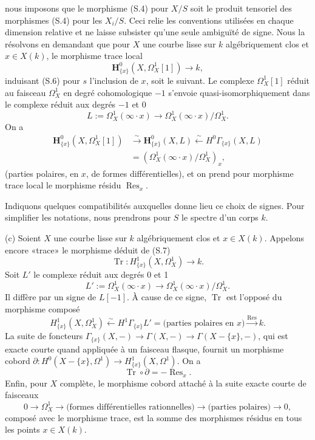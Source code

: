 \documentclass[11pt,leqno]{article}
\DeclareMathOperator{\Res}{Res}
\DeclareMathOperator{\Tr}{Tr}
\begin{document}
nous imposons que le morphisme (S.4) pour $X/S$ soit le produit tensoriel des morphismes (S.4) pour les $X_i/S$. Ceci relie les conventions utilisées en chaque dimension relative et ne laisse subsister qu'une seule ambiguïté de signe. Nous la résolvons en demandant que pour $X$ une courbe lisse sur $k$ algébriquement clos et $x\in X(k)$, le morphisme trace local
\begin{equation}
        \mathbf H^0_{\{x\}}(X,\Omega^1_X[1])\longrightarrow k, \tag{S.7}
\end{equation}
induisant (S.6) pour $s$ l'inclusion de $x$, soit le suivant. Le complexe $\Omega^1_X[1]$ réduit au faisceau $\Omega^1_X$ en degré cohomologique $-1$ s'envoie quasi-isomorphiquement dans le complexe réduit aux degrés $-1$ et 0
\[
        L:=\Omega^1_X(\infty\cdot x)\longrightarrow\Omega^1_X(\infty\cdot x)/\Omega^1_X.
\]
On a
\[
\begin{aligned}
\mathbf H^0_{\{x\}}(X,\Omega^1_X[1])&\xrightarrow{\sim}\mathbf H^0_{\{x\}}(X,L)
\xleftarrow{\sim}H^0\Gamma_{\{x\}}(X,L)\\
&=(\Omega^1_X(\infty\cdot x)/\Omega^1_X)_x,
\end{aligned}
\]
(parties polaires, en $x$, de formes différentielles), et on prend pour morphisme trace local le morphisme résidu $\Res_x$.

Indiquons quelques compatibilités auxquelles donne lieu ce choix de signes. Pour simplifier les notations, nous prendrons pour $S$ le spectre d'un corps $k$.

\noindent (c) Soient $X$ une courbe lisse sur $k$ algébriquement clos et $x\in X(k)$. Appelons encore «trace» le morphisme déduit de (S.7)
\[
        \Tr:H^1_{\{x\}}(X,\Omega^1_X)\longrightarrow k.
\]
Soit $L'$ le complexe réduit aux degrés 0 et 1
\[
        L':=\Omega^1_X(\infty\cdot x)\longrightarrow\Omega^1_X(\infty\cdot x)/\Omega^1_X.
\]
Il diffère par un signe de $L[-1]$. À cause de ce signe, $\Tr$ est l'opposé du morphisme composé
\[
        H^1_{\{x\}}(X,\Omega^1_X)\xleftarrow{\sim}H^1\Gamma_{\{x\}}L'
        =\text{(parties polaires en }x)\xrightarrow{\Res}k.
\]
\clearpage
La suite de foncteurs $\Gamma_{\{x\}}(X,-)\to\Gamma(X,-)\to\Gamma(X-\{x\},-)$, qui est exacte courte quand appliquée à un faisceau flasque, fournit un morphisme cobord $\partial:H^0(X-\{x\},\Omega^1)\to H^1_{\{x\}}(X,\Omega^1)$. On a
\[
        \Tr\circ\partial=-\Res_x.
\]
Enfin, pour $X$ complète, le morphisme cobord attaché à la suite exacte courte de faisceaux
\[
        0\longrightarrow\Omega^1_X\longrightarrow\text{(formes différentielles rationnelles)}
        \longrightarrow\text{(parties polaires)}\longrightarrow0,
\]
composé avec le morphisme trace, est la somme des morphismes résidus en tous les points $x\in X(k)$.
\end{document}
